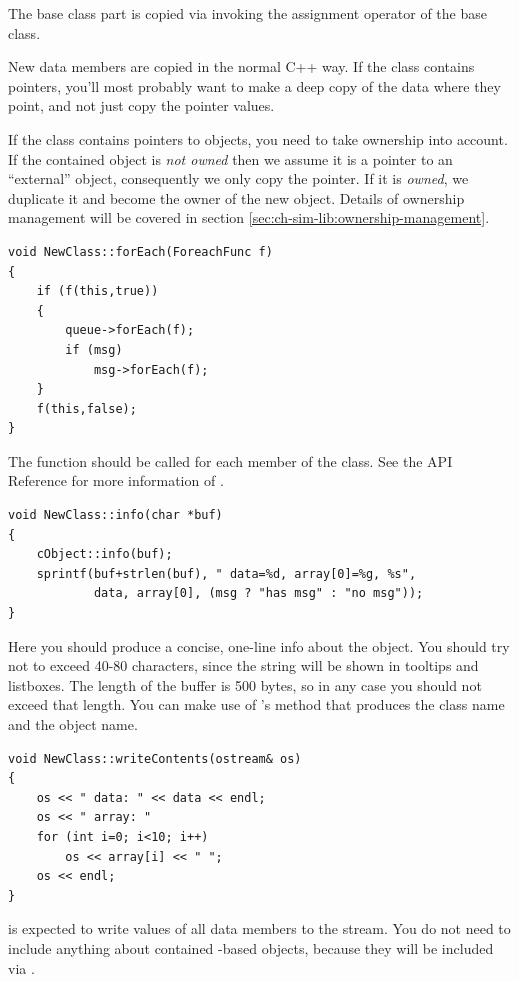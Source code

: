 The base class part is copied via invoking the assignment operator of
the base class.

New data members are copied in the normal C++ way. If the class
contains pointers, you'll most probably want to make a deep copy of
the data where they point, and not just copy the pointer values.

If the class contains pointers to {\opp} objects, you need
to take ownership into account. If the contained object is \textit{not owned}
then we assume it is a pointer to an ``external'' object, consequently
we only copy the pointer. If it is \textit{owned}, we duplicate
it and become the owner of the new object. Details of ownership
management will be covered in section \ref{sec:ch-sim-lib:ownership-management}.


\begin{verbatim}
void NewClass::forEach(ForeachFunc f)
{
    if (f(this,true))
    {
        queue->forEach(f);
        if (msg)
            msg->forEach(f);
    }
    f(this,false);
}
\end{verbatim}

The  function should be called for each {\opp}
member of the class. See the API Reference for more information
of .

\begin{verbatim}
void NewClass::info(char *buf)
{
    cObject::info(buf);
    sprintf(buf+strlen(buf), " data=%d, array[0]=%g, %s",
            data, array[0], (msg ? "has msg" : "no msg"));
}
\end{verbatim}

Here you should produce a concise, one-line info about the object.
You should try not to exceed 40-80 characters, since the
string will be shown in tooltips and listboxes. The length
of the buffer is 500 bytes, so in any case you should not
exceed that length. You can make use of 's
 method that produces the class name and the object name.

\begin{verbatim}
void NewClass::writeContents(ostream& os)
{
    os << " data: " << data << endl;
    os << " array: "
    for (int i=0; i<10; i++)
        os << array[i] << " ";
    os << endl;
}
\end{verbatim}

 is expected to write values of all
data members to the stream.  You do not need to include anything
about contained -based objects, because they
will be included via .


